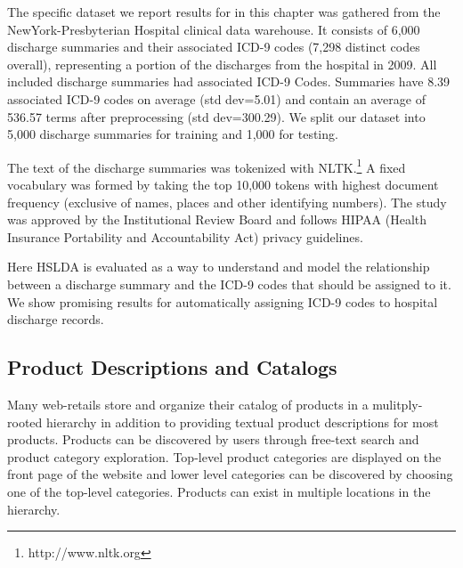 The specific dataset we report results for in this chapter was gathered from the NewYork-Presbyterian Hospital clinical data warehouse. 
It consists of 6,000 discharge summaries and
their associated ICD-9 codes (7,298 distinct codes overall), representing a portion of
the discharges from the hospital in 2009. All included discharge summaries had associated ICD-9 Codes.
Summaries have 8.39 associated ICD-9
codes on average (std dev=5.01) and contain an average of 536.57 terms after
preprocessing (std dev=300.29). We split our dataset into 5,000 discharge
summaries for training and 1,000 for testing.

The text of the discharge summaries was tokenized with
NLTK.\footnote{http://www.nltk.org} A fixed vocabulary was formed by taking
the top 10,000 tokens with highest document frequency (exclusive of names,
places and other identifying numbers). The study was approved
by the Institutional Review Board and follows HIPAA (Health
Insurance Portability and Accountability Act) privacy guidelines.

Here HSLDA is evaluated as a way to understand and model the relationship between a discharge summary and the ICD-9 codes that should be assigned to it.  We show promising results for automatically assigning ICD-9 codes to hospital discharge records.  


\subsection{Product Descriptions and Catalogs}

Many web-retails store and organize their catalog of products in a
mulitply-rooted hierarchy in addition to providing textual product descriptions 
for most products. Products can be discovered by users
through free-text search and product category exploration. Top-level
product categories are displayed on the front page of the website and lower
level categories can be discovered by choosing one of the top-level categories.
Products can exist in multiple locations in the hierarchy.


